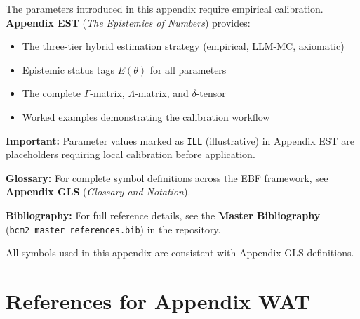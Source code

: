 \begin{tcolorbox}[colback=blue!5!white, colframe=blue!75!black, 
    title=\textbf{Parameter Calibration: See Appendix EST}]
    
The parameters introduced in this appendix require empirical calibration. 
\textbf{Appendix EST} (\textit{The Epistemics of Numbers}) provides:

\begin{itemize}[nosep]
    \item The three-tier hybrid estimation strategy (empirical, LLM-MC, axiomatic)
    \item Epistemic status tags $E(\theta)$ for all parameters
    \item The complete $\Gamma$-matrix, $\Lambda$-matrix, and $\delta$-tensor
    \item Worked examples demonstrating the calibration workflow
\end{itemize}

\textbf{Important:} Parameter values marked as \texttt{ILL} (illustrative) in 
Appendix EST are placeholders requiring local calibration before application.

\end{tcolorbox}





\begin{tcolorbox}[colback=blue!5!white, colframe=blue!75!black, 
    title=\textbf{Central References}]

\textbf{Glossary:} For complete symbol definitions across the EBF framework, 
see \textbf{Appendix GLS} (\textit{Glossary and Notation}).

\textbf{Bibliography:} For full reference details, see the 
\textbf{Master Bibliography} (\texttt{bcm2\_master\_references.bib}) 
in the repository.

All symbols used in this appendix are consistent with Appendix GLS definitions.

\end{tcolorbox}

\section{References for Appendix WAT}
\label{sec:app-c-references}

